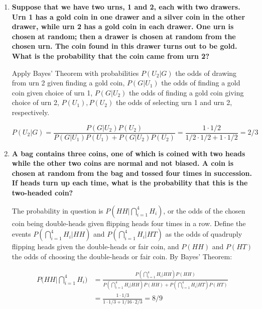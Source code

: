 \documentclass[10pt, oneside]{article}
\begin{document}
\begin{enumerate}[label=3.\arabic*]
\begin{enumerate}
	\end{enumerate}

\item  \begin{tcolorbox}[
  colback=Cerulean!5!white,
  colframe=Cerulean!75!black]
\textbf{Suppose that we have two urns, 1 and 2, each with two drawers. Urn 1 has a gold coin in one drawer and a silver coin in the other drawer, while urn 2 has a gold coin in each drawer. One urn is chosen at random; then a drawer is chosen at random from the chosen urn. The coin found in this drawer turns out to be gold. What is the probability that the coin came from urn 2?}
\end{tcolorbox}

Apply Bayes' Theorem with probabilities $P(U_2 | G)$ the odds of drawing from urn 2 given finding a gold coin, $P(G | U_1)$ the odds of finding a gold coin given choice of urn 1, $P(G | U_2)$ the odds of finding a gold coin giving choice of urn 2, $P(U_1), P(U_2)$ the odds of selecting urn 1 and urn 2, respectively.

\[ P(U_2 | G) = \frac{P(G | U_2) P(U_2)}{ P(G | U_1) P(U_1) + P(G | U_2) P(U_2)} = \frac{1 \cdot 1/2}{1/2 \cdot 1/2 + 1 \cdot 1/2} = \boxed{2/3} \]

\item  \begin{tcolorbox}[
  colback=Cerulean!5!white,
  colframe=Cerulean!75!black]
\textbf{A bag contains three coins, one of which is coined with two heads while the other two coins are normal and not biased. A coin is chosen at random from the bag and tossed four times in succession. If heads turn up each time, what is the probability that this is the two-headed coin?}
\end{tcolorbox}

The probability in question is $P(HH | \bigcap^4_{i=1} H_i)$, or the odds of the chosen coin being double-heads given flipping heads four times in a row. Define the events $P(\bigcap^4_{i=1} H_i | HH)$ and $P(\bigcap^4_{i=1} H_i | HT)$ as the odds of quadruply flipping heads given the double-heads or fair coin, and $P(HH)$ and $P(HT)$ the odds of choosing the double-heads or fair coin. By Bayes' Theorem:

\begin{align*}
P\Bigg( HH \Bigg| \bigcap^4_{i=1} H_i \Bigg) &= \frac{ P(\bigcap^4_{i=1} H_i | HH) P(HH) }{ P(\bigcap^4_{i=1} H_i | HH) P(HH) + P(\bigcap^4_{i=1} H_i | HT) P(HT) } \\
&= \frac{1 \cdot 1/3}{1 \cdot 1/3 + 1/16 \cdot 2/3} = \boxed{8/9}
\end{align*}


\end{enumerate}
\end{document}
